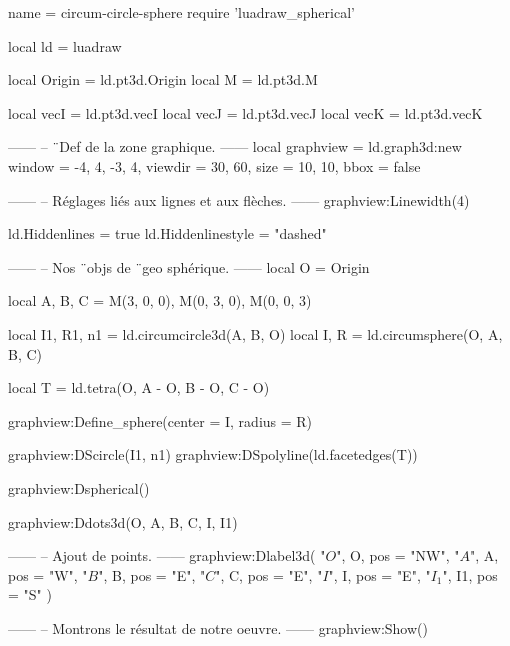 \documentclass[border = 3pt]{standalone}
\begin{document}
\begin{luadraw*}{name = circum-circle-sphere}
require 'luadraw_spherical'

local ld = luadraw

local Origin = ld.pt3d.Origin
local M      = ld.pt3d.M

local vecI = ld.pt3d.vecI
local vecJ = ld.pt3d.vecJ
local vecK = ld.pt3d.vecK

------
-- ¨Def de la zone graphique.
------
local graphview = ld.graph3d:new{
  window  = {-4, 4, -3, 4},
  viewdir = {30, 60},
  size    = {10, 10},
  bbox    = false
}

------
-- Réglages liés aux lignes et aux flèches.
------
graphview:Linewidth(4)

ld.Hiddenlines     = true
ld.Hiddenlinestyle = "dashed"

------
-- Nos ¨objs de ¨geo sphérique.
------
local O = Origin

local A, B, C = M(3, 0, 0), M(0, 3, 0), M(0, 0, 3)

local I1, R1, n1 = ld.circumcircle3d(A, B, O)
local I, R       = ld.circumsphere(O, A, B, C)

local T = ld.tetra(O, A - O, B - O, C - O)

graphview:Define_sphere({center = I, radius = R})

graphview:DScircle({I1, n1})
graphview:DSpolyline(ld.facetedges(T))

graphview:Dspherical()

graphview:Ddots3d({O, A, B, C, I, I1})

------
-- Ajout de points.
------
graphview:Dlabel3d(
  "$O$", O, {pos = "NW"},
  "$A$", A, {pos = "W"},
  "$B$", B, {pos = "E"},
  "$C$", C, {pos = "E"},
  "$I$", I, {pos = "E"},
  "$I_1$", I1, {pos = "S"}
)

------
-- Montrons le résultat de notre oeuvre.
------
graphview:Show()
\end{luadraw*}
\end{document}
